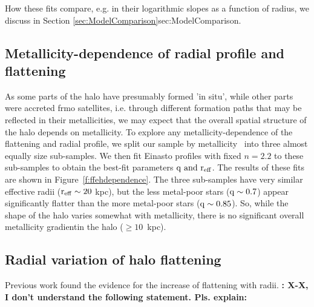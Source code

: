 \documentclass[12pt,preprint]{aastex}
\begin{document}
How these fits compare, e.g. in their logarithmic slopes as a function of radius, we discuss in
Section \ref{sec:ModelComparison}{sec:ModelComparison}.


\subsection{Metallicity-dependence of radial profile and flattening}

As some parts of the halo have presumably formed 'in situ', while other parts were accreted frmo satellites, i.e. through different formation paths that may be reflected in their metallicities, 
 we may expect that the overall spatial structure of the halo depends on metallicity.
To explore any metallicity-dependence of the flattening and radial profile, we split our sample
by metallicity \ into three almost equally size sub-samples. We then fit Einasto profiles with fixed $n=2.2$ to these sub-samples to obtain the best-fit parameters $\rm q ~and ~r_{eff}$. The results of these fits are shown in Figure~\ref{f:ffehdependence}. The three sub-samples have very similar effective radii ($\rm r_{eff}\sim20~$kpc), but the less metal-poor stars ($\rm q\sim0.7$) appear
significantly flatter than the more metal-poor stars ($\rm q\sim0.85$).
So, while the shape of the halo varies somewhat with metallicity, there is no significant overall metallicity gradientin the halo ($\ge 10$~kpc). 

\subsection{Radial variation of halo flattening}
Previous work found the evidence for the increase of flattening with radii\citep{Preston1991}.
{\bf: X-X, I don't understand the following statement. Pls. explain:}
\end{document}
